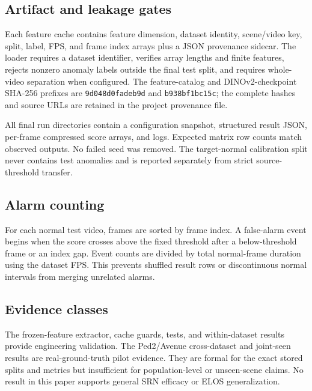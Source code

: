 \subsection{Artifact and leakage gates}

Each feature cache contains feature dimension, dataset identity, scene/video key, split, label, FPS, and frame index arrays plus a JSON provenance sidecar. The loader requires a dataset identifier, verifies array lengths and finite features, rejects nonzero anomaly labels outside the final test split, and requires whole-video separation when configured. The feature-catalog and DINOv2-checkpoint SHA-256 prefixes are \texttt{9d048d0fadeb9d} and \texttt{b938bf1bc15c}; the complete hashes and source URLs are retained in the project provenance file.

All final run directories contain a configuration snapshot, structured result JSON, per-frame compressed score arrays, and logs. Expected matrix row counts match observed outputs. No failed seed was removed. The target-normal calibration split never contains test anomalies and is reported separately from strict source-threshold transfer.

\subsection{Alarm counting}

For each normal test video, frames are sorted by frame index. A false-alarm event begins when the score crosses above the fixed threshold after a below-threshold frame or an index gap. Event counts are divided by total normal-frame duration using the dataset FPS. This prevents shuffled result rows or discontinuous normal intervals from merging unrelated alarms.

\subsection{Evidence classes}

The frozen-feature extractor, cache guards, tests, and within-dataset results provide engineering validation. The Ped2/Avenue cross-dataset and joint-seen results are real-ground-truth pilot evidence. They are formal for the exact stored splits and metrics but insufficient for population-level or unseen-scene claims. No result in this paper supports general SRN efficacy or ELOS generalization.
